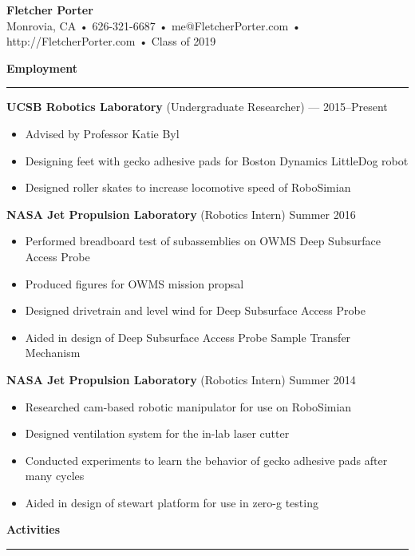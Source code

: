 \documentclass[12pt, oneside]{article}
\newcommand{\titlestyle}[1] {
	{\fontsize{50pt}{1em}\selectfont \bf \textcolor{new_red}{#1}} \\
}
\newcommand{\headingstyleJobs}[1] {
	{\fontsize{20pt}{1em}\selectfont \bf \textcolor{new_red}{#1}}
	\textcolor{new_red}{\rule{3.25in}{0.5pt}} \vspace{3pt}
}
\newcommand{\infostyle}[1] {
	{\fontsize{10pt}{1em}\selectfont #1} \\ \vspace{9pt}
}
\newcommand{\jobtitle}[2] {
	{\bf #1} {#2} \vspace{-10pt} \\
}
\begin{document}
\begin{flushleft}


\titlestyle{Fletcher Porter}
\infostyle{Monrovia, CA • 626-321-6687 • me@FletcherPorter.com • http://FletcherPorter.com • Class of 2019}

\headingstyleJobs{Employment}

\jobtitle{UCSB Robotics Laboratory}{(Undergraduate Researcher) — 2015–Present}
\begin{itemize}
	\item Advised by Professor Katie Byl
	\item Designing feet with gecko adhesive pads for Boston Dynamics LittleDog robot
	\item Designed roller skates to increase locomotive speed of RoboSimian
\end{itemize}\vspace{-7pt}

\jobtitle{NASA Jet Propulsion Laboratory}{(Robotics Intern) Summer 2016}
\begin{itemize}
	\item Performed breadboard test of subassemblies on OWMS Deep Subsurface Access Probe
	\item Produced figures for OWMS mission propsal
	\item Designed drivetrain and level wind for Deep Subsurface Access Probe
	\item Aided in design of Deep Subsurface Access Probe Sample Transfer Mechanism
\end{itemize}\vspace{-7pt}

\jobtitle{NASA Jet Propulsion Laboratory}{(Robotics Intern) Summer 2014}
\begin{itemize}
	\item Researched cam-based robotic manipulator for use on RoboSimian
	\item Designed ventilation system for the in-lab laser cutter
	\item Conducted experiments to learn the behavior of gecko adhesive pads after many cycles
	\item Aided in design of stewart platform for use in zero-g testing
\end{itemize}


\headingstyleJobs{Activities}


\end{flushleft}
\end{document}
